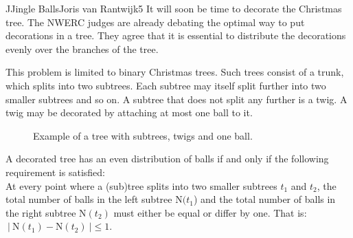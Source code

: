 \begin{icpcproblem}{J}{Jingle Balls}{Joris van Rantwijk}{5}
It will soon be time to decorate the Christmas tree.
The NWERC judges are already debating the optimal way to put decorations in a tree.
They agree that it is essential to distribute the decorations evenly over the branches of the tree.

This problem is limited to binary Christmas trees.
Such trees consist of a trunk, which splits into two subtrees.
Each subtree may itself split further into two smaller subtrees and so on.
A subtree that does not split any further is a twig.
A twig may be decorated by attaching at most one ball to it.

\newcommand{\putball}[2]{\path[draw] ($#2!-0.4cm!#1$) circle (0.4cm) ;}
\begin{figure}[h]
\centering
{}
\caption{Example of a tree with subtrees, twigs and one ball.}
\end{figure}

A decorated tree has an even distribution of balls if and only if the following requirement is satisfied: \\
At every point where a (sub)tree splits into two smaller subtrees $t_1$ and $t_2$, the total number of balls in the left subtree $\mathrm{N}(t_1$) and the total number of balls in the right subtree $\mathrm{N}(t_2)$ must either be equal or differ by one. That is:
 $~ |~ \mathrm{N}(t_1) - \mathrm{N}(t_2) ~| \le 1$.


\end{icpcproblem}
